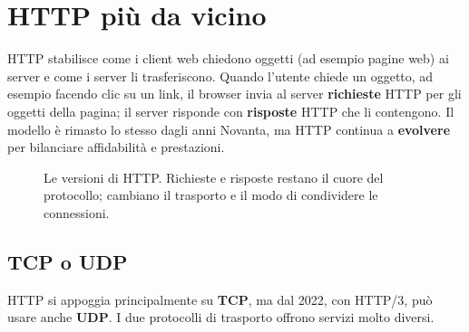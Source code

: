 \section{HTTP più da vicino}

HTTP stabilisce come i client web chiedono oggetti (ad esempio pagine web) ai
server e come i server li trasferiscono. Quando l'utente chiede un oggetto, ad
esempio facendo clic su un link, il browser invia al server \textbf{richieste}
HTTP per gli oggetti della pagina; il server risponde con \textbf{risposte} HTTP
che li contengono. Il modello è rimasto lo stesso dagli anni Novanta, ma HTTP
continua a \textbf{evolvere} per bilanciare affidabilità e prestazioni.

\begin{figure}[H]
\centering
{}
\caption{Le versioni di HTTP. Richieste e risposte restano il cuore del
         protocollo; cambiano il trasporto e il modo di condividere le
         connessioni.}
\end{figure}

\subsection{TCP o UDP}

HTTP si appoggia principalmente su \textbf{TCP}, ma dal 2022, con HTTP/3, può
usare anche \textbf{UDP}. I due protocolli di trasporto offrono servizi molto
diversi.

